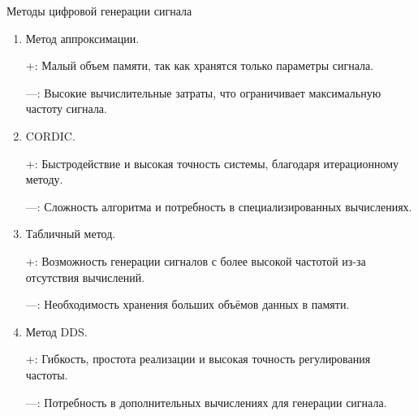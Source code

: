 \documentclass[10pt]{beamer}
\begin{document}
\begin{frame}{Методы цифровой генерации сигнала}
  \begin{enumerate}
		\item Метод аппроксимации. 
		
		+: Малый объем памяти, так как хранятся только параметры сигнала. 
		
		---: Высокие вычислительные затраты, что ограничивает максимальную частоту сигнала.
		
		\item CORDIC.
		
		+: Быстродействие и высокая точность системы, благодаря итерационному методу.
		
		---: Сложность алгоритма и потребность в специализированных вычислениях.
		
		\item Табличный метод.
		
		+: Возможность генерации сигналов с более высокой частотой из-за отсутствия вычислений.
		
		---: Необходимость хранения больших объёмов данных в памяти.
		
		\item Метод DDS.
		
		+: Гибкость, простота реализации и высокая точность регулирования частоты.
		
		---: Потребность в дополнительных вычислениях для генерации сигнала.
  \end{enumerate}
\end{frame}
\end{document}
